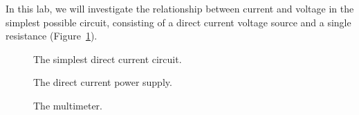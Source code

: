 \documentclass[12pt]{article}
\begin{document}
In this lab, we will investigate the relationship between current and
voltage in the simplest possible circuit, consisting of a direct
current voltage source and a single resistance
(Figure~\ref{fig:simple}).
\begin{figure}
  \centering
  
  \caption{The simplest direct current circuit.}
  \label{fig:simple}
\end{figure}
\begin{figure}
  \centering
  
  \caption{The direct current power supply.}
  \label{fig:dcps}
\end{figure}
\begin{figure}
  \centering
  \qquad
  \caption{The multimeter.}
  \label{fig:multimeter}
\end{figure}
\end{document}
